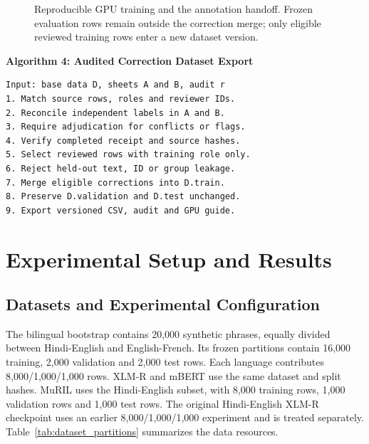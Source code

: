 \documentclass[journal]{IEEEtran}
\begin{document}
\begin{figure}[!t]
\centering
\resizebox{.98\columnwidth}{!}{}
\caption{Reproducible GPU training and the annotation handoff. Frozen evaluation rows remain outside the correction merge; only eligible reviewed training rows enter a new dataset version.}\label{fig:training_review_cycle}
\end{figure}


\par\smallskip\noindent\begin{minipage}[t]{\columnwidth}
\textbf{Algorithm 4: Audited Correction Dataset Export}
\begin{lstlisting}
Input: base data D, sheets A and B, audit r
1. Match source rows, roles and reviewer IDs.
2. Reconcile independent labels in A and B.
3. Require adjudication for conflicts or flags.
4. Verify completed receipt and source hashes.
5. Select reviewed rows with training role only.
6. Reject held-out text, ID or group leakage.
7. Merge eligible corrections into D.train.
8. Preserve D.validation and D.test unchanged.
9. Export versioned CSV, audit and GPU guide.
\end{lstlisting}
\end{minipage}\par\smallskip

\section{Experimental Setup and Results}

\subsection{Datasets and Experimental Configuration}

The bilingual bootstrap contains 20,000 synthetic phrases, equally divided between Hindi-English and English-French. Its frozen partitions contain 16,000 training, 2,000 validation and 2,000 test rows. Each language contributes 8,000/1,000/1,000 rows. XLM-R and mBERT use the same dataset and split hashes. MuRIL uses the Hindi-English subset, with 8,000 training rows, 1,000 validation rows and 1,000 test rows. The original Hindi-English XLM-R checkpoint uses an earlier 8,000/1,000/1,000 experiment and is treated separately. Table~\ref{tab:dataset_partitions} summarizes the data resources.
\end{document}
